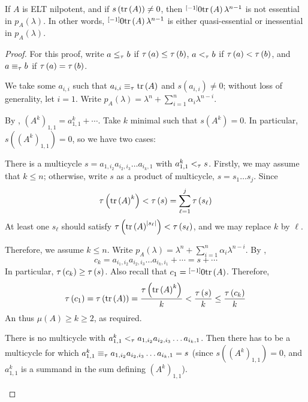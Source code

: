 \begin{lem}\label{lem:ELT-nilpotent-etr}
If $A$ is ELT nilpotent, and if $s\left(\textnormal{tr}\left(A\right)\right)\neq0$, then $\overset{\left[-1\right]}{}0\textnormal{tr}\left(A\right)\lambda^{n-1}$ is not essential in $p_{A}\left(\lambda\right)$. In other words, $\overset{\left[-1\right]}{}0\textnormal{tr}\left(A\right)\lambda^{n-1}$ is either quasi-essential or inessential in $p_{A}\left(\lambda\right)$.
\end{lem}
\begin{proof}
For this proof, write $a\leq_{\tau}b$ if $\tau\left(a\right)\leq\tau\left(b\right)$, $a<_{\tau}b$ if $\tau\left(a\right)<\tau\left(b\right)$, and $a\equiv_{\tau}b$ if $\tau\left(a\right)=\tau\left(b\right)$.

We take some $a_{i,i}$ such that $a_{i,i}\equiv_{\tau}\textnormal{tr}\left(A\right)$ and $s\left(a_{i,i}\right)\ne0$; without loss of generality, let $i=1$. Write $p_{A}\left(\lambda\right)=\lambda^{n}+{\displaystyle \sum_{i=1}^{n}}\alpha_{i}\lambda^{n-i}$.

By , $\left(A^{k}\right)_{1,1}=a_{1,1}^{k}+\cdots$. Take $k$ minimal such that $s\left(A^{k}\right)=0$. In particular, $s\left(\left(A^{k}\right)_{1,1}\right)=0$, so we have two cases:

\begin{casenv}
\item There is a multicycle $s=a_{1,i_{2}}a_{i_{2},i_{3}}\dots a_{i_{k},1}$ with $a_{1,1}^{k}<_{\tau}s$. Firstly, we may assume that $k\leq n$; otherwise, write $s$ as a product of multicycle, $s=s_1\dots s_j$. Since
    $$\tau\left(\textnormal{tr}\left(A\right)^k\right)<\tau\left(s\right)=\sum_{\ell=1}^j\tau\left(s_\ell\right)$$
    At least one $s_\ell$ should satisfy $\tau\left(\textnormal{tr}\left(A\right)^{\left|s_\ell\right|}\right)<\tau\left(s_\ell\right)$, and we may replace $k$ by $\ell$.

    Therefore, we assume $k\leq n$. Write $p_{A}\left(\lambda\right)=\lambda^{n}+{\displaystyle \sum_{i=1}^{n}}\alpha_{i}\lambda^{n-i}$. By ,
    $$c_k=a_{i_1,i_{2}}a_{i_{2},i_{3}}\dots a_{i_{k},i_1}+\cdots=s+\cdots$$
    In particular, $\tau\left(c_k\right)\ge\tau\left(s\right)$. Also recall that $c_1=\overset{\left[-1\right]}{}0\textnormal{tr}\left(A\right)$. Therefore,
    $$\tau\left(c_1\right)=\tau\left(\textnormal{tr}\left(A\right)\right)=\frac{\tau\left(\textnormal{tr}\left(A\right)^k\right)}{k}< \frac{\tau\left(s\right)}{k}\leq\frac{\tau\left(c_k\right)}{k}$$
    An thus $\mu\left(A\right)\ge k\ge 2$, as required.

\item There is no multicycle with $a_{1,1}^{k}<_{\tau}a_{1,i_{2}}a_{i_{2},i_{3}}\dots a_{i_{k},1}$. Then there has to be a multicycle for which $a_{1,1}^{k}\equiv_{\tau}a_{1,i_{2}}a_{i_{2},i_{3}}\dots a_{i_{k},1}=s$ (since $s\left(\left(A^{k}\right)_{1,1}\right)=0$, and $a_{1,1}^k$ is a summand in the sum defining $\left(A^{k}\right)_{1,1}$).


\end{casenv}
\end{proof}
